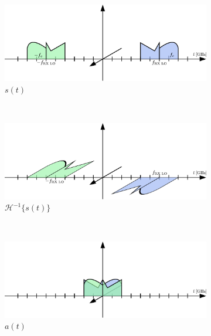 \begin{figure}[ht]
  \centering
  \begin{subfigure}{0.45\textwidth}
    \centering
    \includegraphics[width=\textwidth]{figures/rx_rf_0_freq_s}
    \caption{$s(t)$}
    \label{fig:rx_rf_0_freq_s}
  \end{subfigure}
  ~
  \begin{subfigure}{0.45\textwidth}
    \centering
    \includegraphics[width=\textwidth]{figures/rx_rf_0_freq_Hs}
    \caption{$\mathcal{H}^{-1}\{s(t)\}$}
    \label{fig:rx_rf_0_freq_Hs}
  \end{subfigure}
  \vspace{4ex} \\
  \begin{subfigure}{0.45\textwidth}
    \centering
    \includegraphics[width=\textwidth]{figures/rx_rf_0_freq_a}
    \caption{$a(t)$}
    \label{fig:rx_rf_0_freq_a}
  \end{subfigure}
  ~
  \begin{subfigure}{0.45\textwidth}
    \centering

\end{subfigure}
\end{figure}
